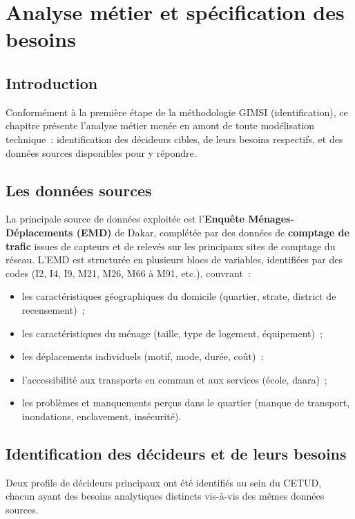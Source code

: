 \chapter{Analyse métier et spécification des besoins}
\label{ch:analyse}

\section{Introduction}
Conformément à la première étape de la méthodologie GIMSI (identification), ce chapitre présente l'analyse métier menée en amont de toute modélisation technique~: identification des décideurs cibles, de leurs besoins respectifs, et des données sources disponibles pour y répondre.

\section{Les données sources}
La principale source de données exploitée est l'\textbf{Enquête Ménages-Déplacements (EMD)} de Dakar, complétée par des données de \textbf{comptage de trafic} issues de capteurs et de relevés sur les principaux sites de comptage du réseau. L'EMD est structurée en plusieurs blocs de variables, identifiées par des codes (I2, I4, I9, M21, M26, M66 à M91, etc.), couvrant~:
\begin{itemize}
\item les caractéristiques géographiques du domicile (quartier, strate, district de recensement)~;
\item les caractéristiques du ménage (taille, type de logement, équipement)~;
\item les déplacements individuels (motif, mode, durée, coût)~;
\item l'accessibilité aux transports en commun et aux services (école, daara)~;
\item les problèmes et manquements perçus dans le quartier (manque de transport, inondations, enclavement, insécurité).
\end{itemize}

\section{Identification des décideurs et de leurs besoins}
Deux profils de décideurs principaux ont été identifiés au sein du CETUD, chacun ayant des besoins analytiques distincts vis-à-vis des mêmes données sources.

